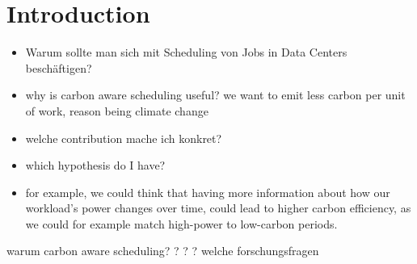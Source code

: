\chapter{Introduction}


\begin{itemize}
    \item Warum sollte man sich mit Scheduling von Jobs in Data Centers beschäftigen?
    \item why is carbon aware scheduling useful? we want to emit less carbon per unit of work, reason being climate change
    \item welche contribution mache ich konkret?
    \item which hypothesis do I have?
    \item for example, we could think that having more information about how our workload's power changes over time, could lead to higher carbon efficiency, as we could for example match high-power to low-carbon periods.

\end{itemize}
warum carbon aware scheduling? ? ? ?
welche forschungsfragen